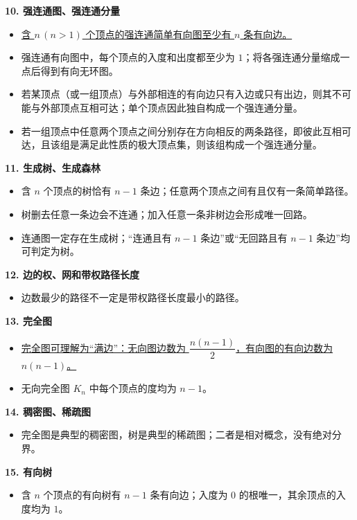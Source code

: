 \documentclass[UTF8,10pt,fontset=mac]{ctexart}
\begin{document}
\noindent\textbf{10. 强连通图、强连通分量}
\begin{itemize}[leftmargin=1.8em,itemsep=1.2pt,topsep=1pt]
  \item \uline{含 $n\,(n>1)$ 个顶点的强连通简单有向图至少有 $n$ 条有向边。}
  \item 强连通有向图中，每个顶点的入度和出度都至少为 $1$；将各强连通分量缩成一点后得到有向无环图。
  \item 若某顶点（或一组顶点）与外部相连的有向边只有入边或只有出边，则其不可能与外部顶点互相可达；单个顶点因此独自构成一个强连通分量。
  \item 若一组顶点中任意两个顶点之间分别存在方向相反的两条路径，即彼此互相可达，且该组是满足此性质的极大顶点集，则该组构成一个强连通分量。
\end{itemize}

\noindent\textbf{11. 生成树、生成森林}
\begin{itemize}[leftmargin=1.8em,itemsep=1.2pt,topsep=1pt]
  \item 含 $n$ 个顶点的树恰有 $n-1$ 条边；任意两个顶点之间有且仅有一条简单路径。
  \item 树删去任意一条边会不连通；加入任意一条非树边会形成唯一回路。
  \item 连通图一定存在生成树；“连通且有 $n-1$ 条边”或“无回路且有 $n-1$ 条边”均可判定为树。
\end{itemize}

\noindent\textbf{12. 边的权、网和带权路径长度}
\begin{itemize}[leftmargin=1.8em,itemsep=1.2pt,topsep=1pt]
  \item 边数最少的路径不一定是带权路径长度最小的路径。
\end{itemize}

\noindent\textbf{13. 完全图}
\begin{itemize}[leftmargin=1.8em,itemsep=1.2pt,topsep=1pt]
  \item \uline{完全图可理解为“满边”：无向图边数为 $\dfrac{n(n-1)}{2}$，有向图的有向边数为 $n(n-1)$。}
  \item 无向完全图 $K_n$ 中每个顶点的度均为 $n-1$。
\end{itemize}

\noindent\textbf{14. 稠密图、稀疏图}
\begin{itemize}[leftmargin=1.8em,itemsep=1.2pt,topsep=1pt]
  \item 完全图是典型的稠密图，树是典型的稀疏图；二者是相对概念，没有绝对分界。
\end{itemize}

\noindent\textbf{15. 有向树}
\begin{itemize}[leftmargin=1.8em,itemsep=1.2pt,topsep=1pt]
  \item 含 $n$ 个顶点的有向树有 $n-1$ 条有向边；入度为 $0$ 的根唯一，其余顶点的入度均为 $1$。
\end{itemize}
\end{document}
